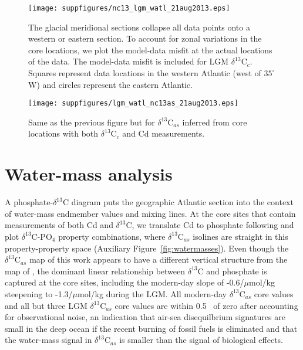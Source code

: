 \documentclass[agums]{aguplus}  %
\begin{document}
\begin{figure}
\texttt{[image: suppfigures/nc13\_lgm\_watl\_21aug2013.eps]}
     \caption{The glacial meridional sections collapse all data points onto a western or eastern section. To account for zonal variations in the core locations, we plot the model-data misfit at the actual locations of the data. The model-data misfit is included for LGM $\delta^{13}$C$_c$. Squares represent data locations in the western Atlantic (west of $35^{\circ}$W) and circles represent the eastern Atlantic.}
\end{figure}

\begin{figure}
     \texttt{[image: suppfigures/lgm\_watl\_nc13as\_21aug2013.eps]}
     \caption{Same as the previous figure but for $\delta^{13}$C$_{as}$ inferred from core locations with both $\delta^{13}$C$_c$ and Cd measurements.}
\end{figure}


\section{Water-mass analysis}

A phosphate-$\delta^{13}$C diagram puts the geographic Atlantic
section into the context of water-mass endmember values and mixing
lines.  At the core sites that contain measurements of both Cd and
$\delta^{13}$C, we translate Cd to phosphate following
\citet{Elderfield-Rickaby-2000:Oceanic} and plot $\delta^{13}$C-PO$_4$
property combinations, where $\delta^{13}$C$_{as}$ isolines are
straight in this property-property space
(Auxiliary Figure~\ref{fig:watermasses}). Even though the $\delta^{13}$C$_{as}$
map of this work appears to have a different vertical structure from
the map of \citet{Marchitto-Broecker-2006:Deep}, the dominant linear
relationship between $\delta^{13}$C and phosphate is captured at the
core sites, including the modern-day slope of -0.6\permil/$\mu$mol/kg
steepening to -1.3\permil/$\mu$mol/kg during the LGM. All modern-day
$\delta^{13}$C$_{as}$ core values and all but three LGM
$\delta^{13}$C$_{as}$ core values are within 0.5\permil~ of zero after
accounting for observational noise, an indication that air-sea
disequilbrium signatures are small in the deep ocean if the recent
burning of fossil fuels is eliminated
\citep[e.g.,][]{Olsen-Ninnemann-2010:Large} and that the water-mass
signal in $\delta^{13}$C$_{as}$ is smaller than the signal of
biological effects.
\end{document}

